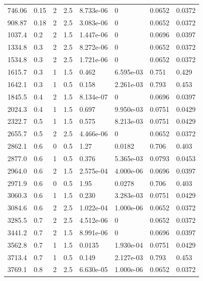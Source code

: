 \documentclass[preview]{standalone}
\begin{document}
{{\begin{tabular}{L{1.2cm}C{1.2cm} C{0.3cm}C{0.5cm} C{1.4cm}C{1.4cm} C{1.4cm}C{1.4cm}}
  746.06  &  0.15  & 2     & 2.5 &  8.733e-06  & 0  & 0.0652 &  0.0372   \\ 
  908.87  &  0.18  & 2     & 2.5 &  3.083e-06  & 0  & 0.0652 &  0.0372   \\ 
  1037.4  &   0.2  & 2     & 1.5 &  1.447e-06  & 0  & 0.0696 &  0.0397   \\ 
  1334.8  &   0.3  & 2     & 2.5 &  8.272e-06  & 0  & 0.0652 &  0.0372   \\ 
  1534.8  &   0.3  & 2     & 2.5 &  1.721e-06  & 0  & 0.0652 &  0.0372   \\ 
  1615.7  &   0.3  & 1     & 1.5 &  0.462  & 6.595e-03  & 0.751 &  0.429   \\ 
  1642.1  &   0.3  & 1     & 0.5 &  0.158  & 2.261e-03  & 0.793 &  0.453   \\ 
  1845.5  &   0.4  & 2     & 1.5 &  8.134e-07  & 0  & 0.0696 &  0.0397   \\ 
  2024.3  &   0.4  & 1     & 1.5 &  0.697  & 9.950e-03  & 0.0751 &  0.0429   \\ 
  2322.7  &   0.5  & 1     & 1.5 &  0.575  & 8.213e-03  & 0.0751 &  0.0429   \\ 
  2655.7  &   0.5  & 2     & 2.5 &  4.466e-06  & 0  & 0.0652 &  0.0372   \\ 
  2862.1  &   0.6  & 0     & 0.5 &  1.27  & 0.0182  & 0.706 &  0.403   \\ 
  2877.0  &   0.6  & 1     & 0.5 &  0.376  & 5.365e-03  & 0.0793 &  0.0453   \\ 
  2964.0  &   0.6  & 2     & 1.5 &  2.575e-04  & 4.000e-06  & 0.0696 &  0.0397   \\ 
  2971.9  &   0.6  & 0     & 0.5 &  1.95  & 0.0278  & 0.706 &  0.403   \\ 
  3060.3  &   0.6  & 1     & 1.5 &  0.230  & 3.283e-03  & 0.0751 &  0.0429   \\ 
  3084.6  &   0.6  & 2     & 2.5 &  1.022e-04  & 1.000e-06  & 0.0652 &  0.0372   \\ 
  3285.5  &   0.7  & 2     & 2.5 &  4.512e-06  & 0  & 0.0652 &  0.0372   \\ 
  3441.2  &   0.7  & 2     & 1.5 &  8.991e-06  & 0  & 0.0696 &  0.0397   \\ 
  3562.8  &   0.7  & 1     & 1.5 &  0.0135  & 1.930e-04  & 0.0751 &  0.0429   \\ 
  3713.4  &   0.7  & 1     & 0.5 &  0.149  & 2.127e-03  & 0.793 &  0.453   \\ 
  3769.1  &   0.8  & 2     & 2.5 &  6.630e-05  & 1.000e-06  & 0.0652 &  0.0372   \\ 

\end{tabular}}}
\end{document}
